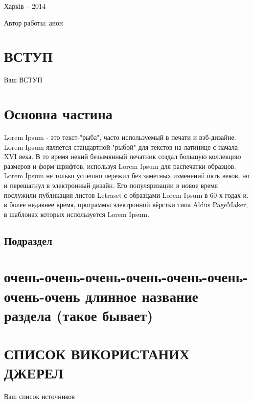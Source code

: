 \documentclass[a4paper, 14pt]{article}
\let\stdsection\section
\renewcommand\section{\newpage\stdsection}
\begin{document}
\begin{center}
Харків -- 2014 
\end{center}

\newpage
Автор работы: анон
\newpage

\renewcommand{\contentsname}{\normalsize \hspace{1.25em} ЗМІСТ} %

\tableofcontents %

\newpage
{} %
\section*{\textbf{ВСТУП}}
Ваш ВСТУП
\newpage %
\section{Основна частина}
Lorem Ipsum - это текст-"рыба", часто используемый в печати и вэб-дизайне. Lorem Ipsum является стандартной "рыбой" для текстов на латинице с начала XVI века. В то время некий безымянный печатник создал большую коллекцию размеров и форм шрифтов, используя Lorem Ipsum для распечатки образцов. Lorem Ipsum не только успешно пережил без заметных изменений пять веков, но и перешагнул в электронный дизайн. Его популяризации в новое время послужили публикация листов Letraset с образцами Lorem Ipsum в 60-х годах и, в более недавнее время, программы электронной вёрстки типа Aldus PageMaker, в шаблонах которых используется Lorem Ipsum.

\subsection{Подраздел}
\section{очень-очень-очень-очень-очень-очень-очень-очень длинное название раздела (такое бывает)}
\section*{СПИСОК ВИКОРИСТАНИХ ДЖЕРЕЛ}
Ваш список источников
\end{document}
